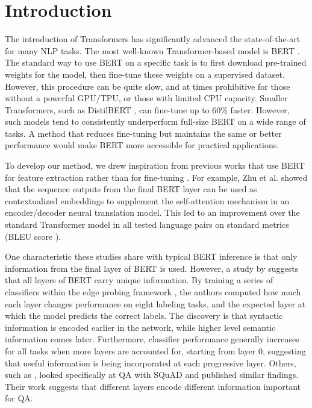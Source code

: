 \section{Introduction}


The introduction of Transformers \cite{Vaswani2017} has significantly advanced the state-of-the-art for many NLP tasks. The most well-known Transformer-based model is BERT \cite{Devlin2019}. The standard way to use BERT on a specific task is to first download pre-trained weights for the model, then fine-tune these weights on a supervised dataset. However, this procedure can be quite slow, and at times prohibitive for those without a powerful GPU/TPU, or those with limited CPU capacity. Smaller Transformers, such as DistilBERT \cite{sanh2019distilbert}, can fine-tune up to 60\% faster. However, such models tend to consistently underperform full-size BERT on a wide range of tasks. A method that reduces fine-tuning but maintains the same or better performance would make BERT more accessible for practical applications.

To develop our method, we drew inspiration from previous works that use BERT for feature extraction rather than for fine-tuning \citep{Zhu2020IncorporatingBI, Chen_2020}. For example, Zhu et al. showed that the sequence outputs from the final BERT layer can be used as contextualized embeddings to supplement the self-attention mechanism in an encoder/decoder neural translation model. This led to an improvement over the standard Transformer model in all tested language pairs on standard metrics (BLEU score \cite{Papineni02bleu:a}).

One characteristic these studies share with typical BERT inference is that only information from the final layer of BERT is used. However, a study by \cite{tenney-etal-2019-bert} suggests that all layers of BERT carry unique information. By training a series of classifiers within the edge probing framework \cite{DBLP:journals/corr/abs-1905-06316}, the authors computed how much each layer changes performance on eight labeling tasks, and the expected layer at which the model predicts the correct labels. The discovery is that syntactic information is encoded earlier in the network, while higher level semantic information comes later. Furthermore, classifier performance generally increases for all tasks when more layers are accounted for, starting from layer 0, suggesting that useful information is being incorporated at each progressive layer. Others, such as \cite{van_Aken_2019}, looked specifically at QA with SQuAD and published similar findings. Their work suggests that different layers encode different information important for QA.

